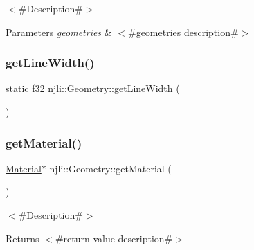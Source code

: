 $<$\#\+Description\#$>$


\begin{DoxyParams}{Parameters}
{\em geometries} & $<$\#geometries description\#$>$ \\
\hline
\end{DoxyParams}
\mbox{\label{classnjli_1_1_geometry_a1c16844fdb0bd887c6338bfb445a1804}} 
\subsubsection{\texorpdfstring{get\+Line\+Width()}{getLineWidth()}}
{\footnotesize\ttfamily static \mbox{\hyperlink{_util_8h_a5f6906312a689f27d70e9d086649d3fd}{f32}} njli\+::\+Geometry\+::get\+Line\+Width (\begin{DoxyParamCaption}{ }\end{DoxyParamCaption})\hspace{0.3cm}{\ttfamily [static]}}

\mbox{\label{classnjli_1_1_geometry_aeb3c06288fdf26e61eb942abc69d7d02}} 
\subsubsection{\texorpdfstring{get\+Material()}{getMaterial()}\hspace{0.1cm}{\footnotesize\ttfamily [1/2]}}
{\footnotesize\ttfamily \mbox{\hyperlink{classnjli_1_1_material}{Material}}$\ast$ njli\+::\+Geometry\+::get\+Material (\begin{DoxyParamCaption}{ }\end{DoxyParamCaption})}

$<$\#\+Description\#$>$

\begin{DoxyReturn}{Returns}
$<$\#return value description\#$>$ 
\end{DoxyReturn}
\mbox{\label{classnjli_1_1_geometry_a9eae0bae53bb1936e80a632e6fe48438}} 
